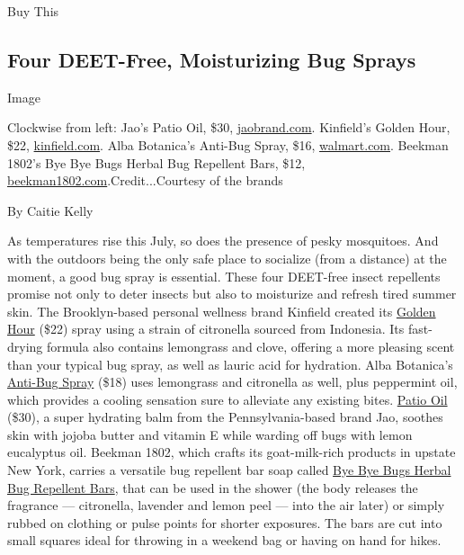 Buy This

\hypertarget{four-deet-free-moisturizing-bug-sprays}{%
\subsection{Four DEET-Free, Moisturizing Bug
Sprays}\label{four-deet-free-moisturizing-bug-sprays}}

Image

Clockwise from left: Jao's Patio Oil, \$30,
\href{https://jaobrand.com/collections/apothecary/products/patio-oil}{jaobrand.com}.
Kinfield's Golden Hour, \$22,
\href{https://kinfield.com/products/golden-hour?utm_source=tmag\&utm_medium=pr\&utm_campaign=tlistjune2020}{kinfield.com}.
Alba Botanica's Anti-Bug Spray, \$16,
\href{https://www.walmart.com/ip/Alba-Botanica-Anti-Bug-Deet-free-Insect-Repellent-Spray-4-Oz/349243024}{walmart.com}.
Beekman 1802's Bye Bye Bugs Herbal Bug Repellent Bars, \$12,
\href{https://beekman1802.com/products/bug-repellent-soap}{beekman1802.com}.Credit...Courtesy
of the brands

By Caitie Kelly

As temperatures rise this July, so does the presence of pesky
mosquitoes. And with the outdoors being the only safe place to socialize
(from a distance) at the moment, a good bug spray is essential. These
four DEET-free insect repellents promise not only to deter insects but
also to moisturize and refresh tired summer skin. The Brooklyn-based
personal wellness brand Kinfield created its
\href{https://kinfield.com/products/golden-hour}{Golden Hour} (\$22)
spray using a strain of citronella sourced from Indonesia. Its
fast-drying formula also contains lemongrass and clove, offering a more
pleasing scent than your typical bug spray, as well as lauric acid for
hydration. Alba Botanica's
\href{https://www.walmart.com/ip/Alba-Botanica-Anti-Bug-Deet-free-Insect-Repellent-Spray-4-Oz/349243024}{Anti-Bug
Spray} (\$18) uses lemongrass and citronella as well, plus peppermint
oil, which provides a cooling sensation sure to alleviate any existing
bites.
\href{https://jaobrand.com/collections/apothecary/products/patio-oil}{Patio
Oil} (\$30), a super hydrating balm from the Pennsylvania-based brand
Jao, soothes skin with jojoba butter and vitamin E while warding off
bugs with lemon eucalyptus oil. Beekman 1802, which crafts its
goat-milk-rich products in upstate New York, carries a versatile bug
repellent bar soap called
\href{https://beekman1802.com/products/bug-repellent-soap}{Bye Bye Bugs
Herbal Bug Repellent Bars}, that can be used in the shower (the body
releases the fragrance --- citronella, lavender and lemon peel --- into
the air later) or simply rubbed on clothing or pulse points for shorter
exposures. The bars are cut into small squares ideal for throwing in a
weekend bag or having on hand for hikes.

